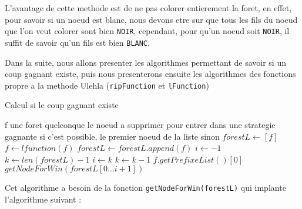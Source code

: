 L'avantage de cette methode est de ne pas colorer entierement la foret, en effet, pour savoir si un noeud est blanc, nous devons etre sur que tous les fils du noeud que l'on veut colorer sont bien \texttt{NOIR}, cependant, pour qu'un noeud soit \texttt{NOIR}, il suffit de savoir qu'un fils est bien \texttt{BLANC}.

Dans la suite, nous allons presenter les algorithmes permettant de savoir si un coup gagnant existe, puis nous presenterons ensuite les algorithmes des fonctions propre a la methode Ulehla (\texttt{ripFunction} et \texttt{lFunction})

\begin{algorithm}[h]
  \caption{Calcul si le coup gagnant existe}
  \begin{algorithmic}
    \REQUIRE f une foret quelconque
    \ENSURE le noeud a supprimer pour entrer dans une strategie gagnante si c'est possible, le premier noeud de la liste sinon
    \STATE $forestL \leftarrow [f]$
      \STATE $f \leftarrow lfunction(f)$
      \STATE $forestL \leftarrow forestL.append(f)$
    \ENDWHILE
    \STATE $i \leftarrow -1$
    \STATE $k \leftarrow len(forestL) - 1$
        \STATE $i \leftarrow k$
      \ENDIF
      \STATE $k \leftarrow k - 1$
    \ENDWHILE
      \RETURN $f.getPrefixeList()[0]$
    \ELSE
      \RETURN $getNodeForWin(forestL[0...i + 1])$
    \ENDIF
  \end{algorithmic}
\end{algorithm}

Cet algorithme a besoin de la fonction \texttt{getNodeForWin(forestL)} qui implante l'algorithme suivant :

